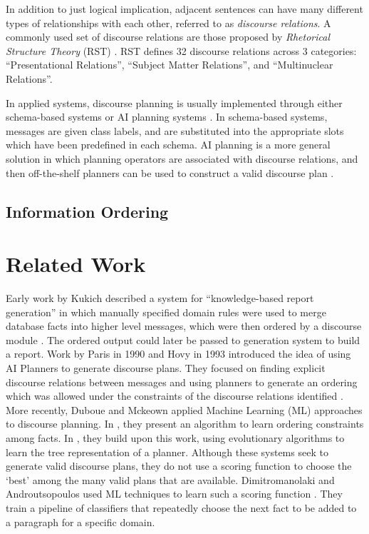 \documentclass[12pt]{article}
\begin{document}
In addition to just logical implication, adjacent sentences can have many different types of relationships with each other, referred to as {\em discourse relations}. A commonly used set of discourse relations are those proposed by {\em Rhetorical Structure Theory} (RST) \cite{rst}. RST defines 32 discourse relations across 3 categories: ``Presentational Relations'', ``Subject Matter Relations'', and ``Multinuclear Relations''.

In applied systems, discourse planning is usually implemented through either schema-based systems or AI planning systems \cite{applied_nlg}. In schema-based systems, messages are given class labels, and are substituted into the appropriate slots which have been predefined in each schema. AI planning is a more general solution in which planning operators are associated with discourse relations, and then off-the-shelf planners can be used to construct a valid discourse plan \cite{hovy1993automated}\cite{paris1990natural}.

\subsection{Information Ordering}

\section{Related Work}

Early work by Kukich described a system for ``knowledge-based report generation'' in which manually specified domain rules were used to merge database facts into higher level messages, which were then ordered by a discourse module \cite{kukich1983knowledge}. The ordered output could later be passed to generation system to build a report. Work by Paris in 1990 and Hovy in 1993 introduced the idea of using AI Planners to generate discourse plans. They focused on finding explicit discourse relations between messages and using planners to generate an ordering which was allowed under the constraints of the discourse relations identified \cite{paris1990natural}\cite{hovy1993automated}. More recently, Duboue and Mckeown applied Machine Learning (ML) approaches to discourse planning. In \cite{duboue2001empirically}, they present an algorithm to learn ordering constraints among facts. In \cite{duboue2002content}, they build upon this work, using evolutionary algorithms to learn the tree representation of a planner. Although these systems seek to generate valid discourse plans, they do not use a scoring function to choose the `best' among the many valid plans that are available. Dimitromanolaki and Androutsopoulos used ML techniques to learn such a scoring function \cite{learning_to_order_facts}. They train a pipeline of classifiers that repeatedly choose the next fact to be added to a paragraph for a specific domain.
\end{document}
